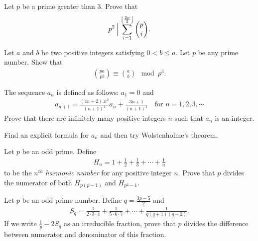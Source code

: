 \documentclass{subfile}
\begin{document}
	\begin{problem}[Putnam 1996] %
		Let $p$ be a prime greater than $3$. Prove that
		\begin{align*}
		p^2\, \Big| \, \sum_{i=1}^{\left\lfloor\frac{2p}{3}\right\rfloor}\dbinom{p}{i}.
		\end{align*}
	\end{problem}
	
	\begin{problem} %
		Let $a$ and $b$ be two positive integers satisfying $0<b\leq a.$ Let $p$ be any prime number. Show that
		\begin{align*}
		\binom{pa}{pb}\equiv \binom{a}{b} \mod p^3.
		\end{align*}
	\end{problem}
	
	\begin{problem} %
		The sequence $a_n$ is defined as follows: $a_1 = 0$ and
		\begin{align*}
		a_{n+1}=\frac{\ensuremath{(4n+2).n^{3}}}{(n+1)^{4}}a_{n}+\frac{3n+1}{(n+1)^{4}} \quad \text{for } n=1,2,3,\cdots
		\end{align*}
		Prove that there are infinitely many positive integers $n$ such that $a_n$ is an integer.
	\end{problem}
	
	\begin{hint}
		Find an explicit formula for $a_n$ and then try Wolstenholme's theorem.
	\end{hint}
	
	\begin{problem} %
		Let $p$ be an odd prime. Define
		\begin{align*}
		H_n = 1 + \frac{1}{2} + \frac{1}{3} + \cdots + \frac{1}{n}
		\end{align*}
		to be the $n^{th}$ \textit{harmonic number} for any positive integer $n$. Prove that $p$ divides the numerator of both $H_{p(p-1)}$ and $H_{p^2-1}$.
	\end{problem}
	
	\begin{problem} %
		Let $p$ be an odd prime number. Define $q = \frac{3p-5}{2}$ and  
		\begin{align*}
		S_q = \frac{1}{2 \cdot 3 \cdot 4} + \frac {1}{5 \cdot 6 \cdot 7} + \cdots + \frac{1}{q(q+1)(q+2)}.
		\end{align*}
		If we write $\frac{1}{p} - 2S_q $ as an irreducible fraction, prove that $p$ divides the difference between numerator and denominator of this fraction.
	\end{problem}
	
\end{document}
